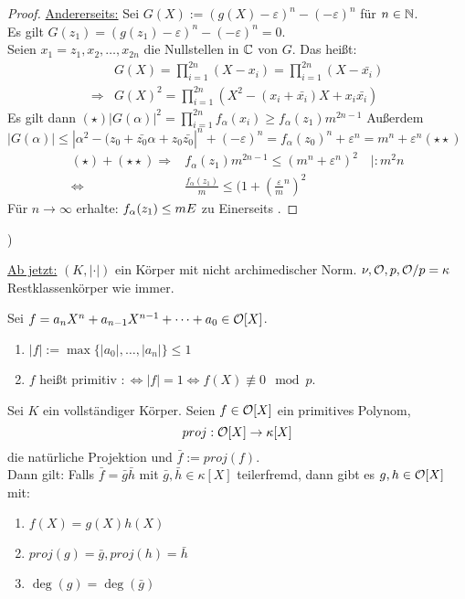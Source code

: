 \begin{proof}
\underline{Andererseits:} Sei $G(X):=(g(X)-\varepsilon)^n-(-\varepsilon)^n$ für $n \in \mathbb{N}$.\\
Es gilt $G(z_1)=(g(z_1)-\varepsilon)^n-(-\varepsilon)^n=0.$\\
Seien $x_1=z_1, x_2, \dots, x_{2n}$ die Nullstellen in $\mathbb{C}$ von $G$. Das heißt:
\begin{align*}
&G(X)=\prod_{i=1}^{2n}(X-x_i)=\prod_{i=1}^{2n}(X-\bar{x_i})\\
\Rightarrow & G(X)^2=\prod_{i=1}^{2n}(X^2-(x_i+\bar{x_i})X+x_i\bar{x_i})
\end{align*}
Es gilt dann
$(\star) |G(\alpha)|^2=\prod_{i=1}^{2n} f_\alpha (x_i)\geq f_\alpha(z_1)m^{2n-1}$
Außerdem $|G(\alpha)| \leq |\alpha^2-(z_0+\bar{z_0}\alpha+z_0\bar{z_0}|^n+(-\varepsilon)^n=f_\alpha(z_0)^n+\varepsilon^n=m^n+\varepsilon^n (\star \star)$\\
\begin{align*}
(\star) + (\star \star) \Rightarrow & f_\alpha(z_1)m^{2n-1}\leq (m^n+\varepsilon^n)^2 \quad |:m^2n\\
\iff & \frac{f_\alpha(z_1)}{m} \leq (1+(\frac{\varepsilon}{m}^n)^2
\end{align*}
Für $n \to \infty$ erhalte: $f_\alpha(z_1) \leq m \Lightning$ zu \glqq Einerseits \grqq.
\end{proof})

\underline{Ab jetzt:} $(K, |\cdot|)$ ein Körper mit nicht archimedischer Norm. $\nu, \mathcal{O}, p, \mathcal{O}/p=\kappa$ Restklassenkörper wie immer.

\begin{defi}
Sei $f=a_nX^n+a_{n-1}X^{n-1}+ \dots + a_0 \in \mathcal{O}[X]$.
\begin{enumerate}
\item $|f|:=\max\{|a_0|, \dots, |a_n|\} \leq 1$
\item $f$ heißt primitiv $: \iff |f|=1 \iff f(X)\not \equiv 0 \mod p$.
\end{enumerate}
\end{defi}

\begin{Satz}
Sei $K$ ein vollständiger Körper. Seien $f \in \mathcal{O}[X]$ ein primitives Polynom,
\[proj: \mathcal{O}[X] \to \kappa[X]\]
die natürliche Projektion und $\bar{f}:=proj(f)$.\\
Dann gilt: Falls $\bar{f}=\bar{g}\bar{h}$ mit $\bar{g}, \bar{h} \in \kappa[X]$ teilerfremd, dann gibt es $g,h \in \mathcal{O}[X]$ mit:
\begin{enumerate}[(1)]
\item $f(X)=g(X)h(X)$
\item $proj(g)=\bar{g}, proj(h)=\bar{h}$
\item $\deg(g)=\deg(\bar{g})$
\end{enumerate}
\end{Satz}


